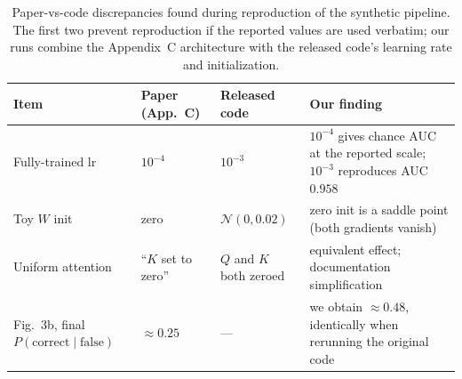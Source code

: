 


\begin{table}[t]
  \centering
  \small
  \begin{tabular}{llll}
    \toprule
    Item & Paper (App.~C) & Released code & Our finding \\
    \midrule
    Fully-trained lr & $10^{-4}$ & $10^{-3}$ &
      $10^{-4}$ gives chance AUC at the reported scale;
      $10^{-3}$ reproduces AUC $0.958$ \\
    Toy $W$ init & zero & $\mathcal{N}(0, 0.02)$ &
      zero init is a saddle point (both gradients vanish) \\
    Uniform attention & ``$K$ set to zero'' & $Q$ and $K$ both zeroed &
      equivalent effect; documentation simplification \\
    Fig.~3b, final $P(\mathrm{correct} \mid \mathrm{false})$ & $\approx 0.25$ & --- &
      we obtain $\approx 0.48$, identically when rerunning the original code \\
    \bottomrule
  \end{tabular}
  \caption{Paper-vs-code discrepancies found during reproduction of the
  synthetic pipeline. The first two prevent reproduction if the reported
  values are used verbatim; our runs combine the Appendix~C
  architecture with the released code's learning rate and
  initialization.}
  \label{tab:corrections}
\end{table}

